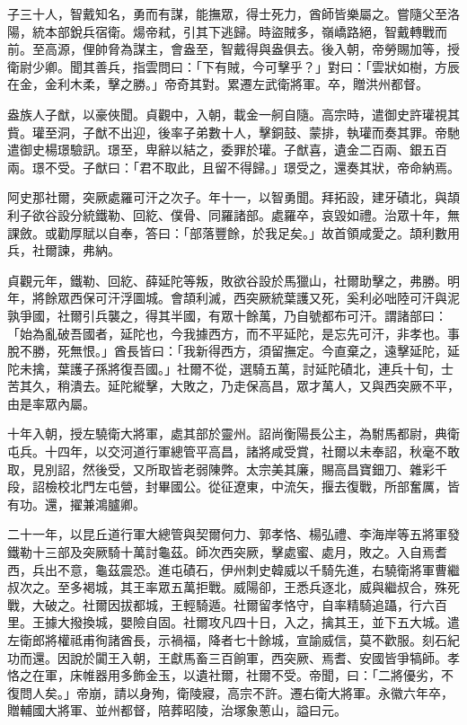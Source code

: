 \begin{pinyinscope}
 子三十人，智戴知名，勇而有謀，能撫眾，得士死力，酋師皆樂屬之。嘗隨父至洛陽，統本部銳兵宿衛。煬帝弒，引其下逃歸。時盜賊多，嶺嶠路絕，智戴轉戰而前。至高源，俚帥脅為謀主，會盎至，智戴得與盎俱去。後入朝，帝勞賜加等，授衛尉少卿。聞其善兵，指雲問曰：「下有賊，今可擊乎？」對曰：「雲狀如樹，方辰在金，金利木柔，擊之勝。」帝奇其對。累遷左武衛將軍。卒，贈洪州都督。



 盎族人子猷，以豪俠聞。貞觀中，入朝，載金一舸自隨。高宗時，遣御史許瓘視其貲。瓘至洞，子猷不出迎，後率子弟數十人，擊銅鼓、蒙排，執瓘而奏其罪。帝馳遣御史楊璟驗訊。璟至，卑辭以結之，委罪於瓘。子猷喜，遺金二百兩、銀五百兩。璟不受。子猷曰：「君不取此，且留不得歸。」璟受之，還奏其狀，帝命納焉。



 阿史那社爾，突厥處羅可汗之次子。年十一，以智勇聞。拜拓設，建牙磧北，與頡利子欲谷設分統鐵勒、回紇、僕骨、同羅諸部。處羅卒，哀毀如禮。治眾十年，無課斂。或勸厚賦以自奉，答曰：「部落豐餘，於我足矣。」故首領咸愛之。頡利數用兵，社爾諫，弗納。



 貞觀元年，鐵勒、回紇、薛延陀等叛，敗欲谷設於馬獵山，社爾助擊之，弗勝。明年，將餘眾西保可汗浮圖城。會頡利滅，西突厥統葉護又死，奚利必咄陸可汗與泥孰爭國，社爾引兵襲之，得其半國，有眾十餘萬，乃自號都布可汗。謂諸部曰：「始為亂破吾國者，延陀也，今我據西方，而不平延陀，是忘先可汗，非孝也。事脫不勝，死無恨。」酋長皆曰：「我新得西方，須留撫定。今直棄之，遠擊延陀，延陀未擒，葉護子孫將復吾國。」社爾不從，選騎五萬，討延陀磧北，連兵十旬，士苦其久，稍潰去。延陀縱擊，大敗之，乃走保高昌，眾才萬人，又與西突厥不平，由是率眾內屬。



 十年入朝，授左驍衛大將軍，處其部於靈州。詔尚衡陽長公主，為駙馬都尉，典衛屯兵。十四年，以交河道行軍總管平高昌，諸將咸受賞，社爾以未奉詔，秋毫不敢取，見別詔，然後受，又所取皆老弱陳弊。太宗美其廉，賜高昌寶鈿刀、雜彩千段，詔檢校北門左屯營，封畢國公。從征遼東，中流矢，揠去復戰，所部奮厲，皆有功。還，擢兼鴻臚卿。



 二十一年，以昆丘道行軍大總管與契爾何力、郭孝恪、楊弘禮、李海岸等五將軍發鐵勒十三部及突厥騎十萬討龜茲。師次西突厥，擊處蜜、處月，敗之。入自焉耆西，兵出不意，龜茲震恐。進屯磧石，伊州刺史韓威以千騎先進，右驍衛將軍曹繼叔次之。至多褐城，其王率眾五萬拒戰。威陽卻，王悉兵逐北，威與繼叔合，殊死戰，大破之。社爾因拔都城，王輕騎遁。社爾留孝恪守，自率精騎追躡，行六百里。王據大撥換城，嬰險自固。社爾攻凡四十日，入之，擒其王，並下五大城。遣左衛郎將權祗甫徇諸酋長，示禍福，降者七十餘城，宣諭威信，莫不歡服。刻石紀功而還。因說於闐王入朝，王獻馬畜三百餉軍，西突厥、焉耆、安國皆爭犒師。孝恪之在軍，床帷器用多飾金玉，以遺社爾，社爾不受。帝聞，曰：「二將優劣，不復問人矣。」帝崩，請以身殉，衛陵寢，高宗不許。遷右衛大將軍。永徽六年卒，贈輔國大將軍、並州都督，陪葬昭陵，治塚象蔥山，謚曰元。




\end{pinyinscope}
